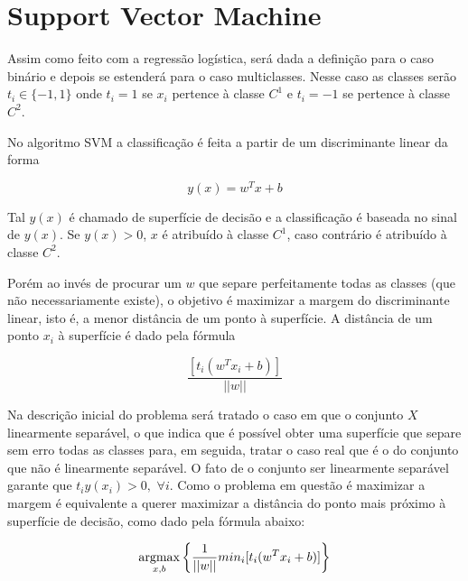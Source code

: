 \section{Support Vector Machine}

Assim como feito com a regressão logística, será dada a definição
para o caso binário e depois se estenderá para o caso multiclasses. Nesse caso
as  classes serão $t_i \in \{-1, 1\}$ onde $t_i = 1$ se $x_i$ pertence à classe $C^1$ e
$t_i = -1$ se pertence à classe $C^2$.

No algoritmo SVM a classificação é feita a partir de um discriminante linear
da forma 

\begin{center}
	\begin{equation}\label{eq:svm-discriminant}
		y(x) = w^Tx + b
	\end{equation}
\end{center}

Tal $y(x)$ é chamado de superfície de decisão e a classificação é baseada no sinal de
$y(x)$. Se $y(x) > 0$, $x$ é atribuído à classe $C^1$, caso contrário é atribuído à classe
$C^2$.

Porém ao invés de procurar um $w$ que separe perfeitamente todas as classes (que
não necessariamente existe), o objetivo é maximizar a margem do discriminante
linear, isto é, a menor distância de um ponto à superfície. A distância de um ponto $x_i$ à
superfície é dado pela fórmula

\begin{center}
	\begin{equation}
		\frac{[t_i(w^Tx_i + b)]}{||w||}
	\end{equation}
\end{center}
 
Na descrição inicial do problema será tratado o caso em que o conjunto $X$ linearmente separável, 
o que indica que é possível obter uma superfície que separe sem erro todas as classes para, em
seguida, tratar o caso real que é o do conjunto que não é linearmente separável.
O fato de o conjunto ser linearmente separável garante que $t_iy(x_i) > 0,$ $\forall i$.
Como o problema em questão é maximizar a margem é equivalente a querer maximizar
a distância do ponto mais próximo à superfície de decisão, como dado pela fórmula abaixo:

\begin{center}
	\begin{equation}
		\operatorname*{argmax}_{x, b} \left\{ \frac{1}{||w||} min_i [t_i(w^Tx_i + b)] \right\}
	\end{equation}
\end{center}


